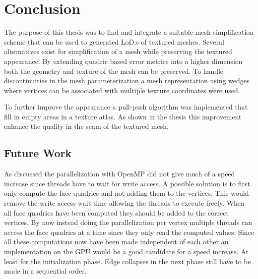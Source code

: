 
\chapter{Conclusion} \label{cha:conclusion}

The purpose of this thesis was to find and integrate a suitable mesh simplification scheme that can be used to generated LoD:s of textured meshes. Several alternatives exist for simplification of a mesh while preserving the textured appearance. By extending quadric based error metrics into a higher dimension both the geometry and texture of the mesh can be preserved. To handle discontinuities in the mesh parameterization a mesh representation using wedges where vertices can be associated with multiple texture coordinates were used.

To further improve the appearance a pull-push algorithm was implemented that fill in empty areas in a texture atlas. As shown in the thesis this improvement enhance the quality in the seam of the textured mesh.

\section{Future Work}
As discussed the parallelization with OpenMP did not give much of a speed increase since threads have to wait for write access. A possible solution is to first only compute the face quadrics and not adding them to the vertices. This would remove the write access wait time allowing the threads to execute freely. When all face quadrics have been computed they should be added to the correct vertices. By now instead doing the parallelization per vertex multiple threads can access the face quadrics at a time since they only read the computed values. Since all these computations now have been made independent of each other an implementation on the GPU would be a good candidate for a speed increase. At least for the initialization phase. Edge collapses in the next phase still have to be made in a sequential order.  

